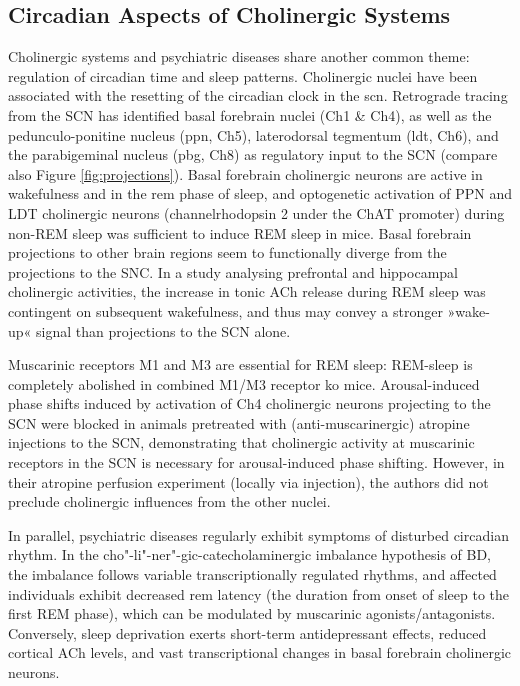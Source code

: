 \subsection{Circadian Aspects of Cholinergic Systems}
Cholinergic systems and psychiatric diseases share another common theme: regulation of circadian time and sleep patterns. Cholinergic nuclei have been associated with the resetting of the circadian clock in the \ac{scn}. Retrograde tracing from the SCN\cite{Bina1993} has identified basal forebrain nuclei (Ch1 \& Ch4), as well as the pedunculo-ponitine nucleus (\acs{ppn}, Ch5), laterodorsal tegmentum (\acs{ldt}, Ch6), and the parabigeminal nucleus (\ac{pbg}, Ch8) as regulatory input to the SCN (compare also Figure \ref{fig:projections}). Basal forebrain cholinergic neurons are active in wakefulness and in the \ac{rem} phase of sleep,\cite{Xu2015} and optogenetic activation of PPN and LDT cholinergic neurons (channelrhodopsin 2 under the ChAT promoter) during non-REM sleep was sufficient to induce REM sleep in mice.\cite{VanDort2015} Basal forebrain projections to other brain regions seem to functionally diverge from the projections to the SNC. In a study analysing prefrontal and hippocampal cholinergic activities, the increase in tonic ACh release during REM sleep was contingent on subsequent wakefulness,\cite{Teles-GriloRuivo2017} and thus may convey a stronger »wake-up« signal than projections to the SCN alone.

Muscarinic receptors M1 and M3 are essential for REM sleep: REM-sleep is completely abolished in combined M1/M3 receptor \ac{ko} mice.\cite{Niwa2018} Arousal-induced phase shifts induced by activation of Ch4 cholinergic neurons projecting to the SCN were blocked in animals pretreated with (anti-muscarinergic) atropine injections to the SCN, demonstrating that cholinergic activity at muscarinic receptors in the SCN is necessary for arousal-induced phase shifting.\cite{Yamakawa2016} However, in their atropine perfusion experiment (locally via injection), the authors did not preclude cholinergic influences from the other nuclei. 

In parallel, psychiatric diseases regularly exhibit symptoms of disturbed circadian rhythm. In the cho"-li"-ner"-gic-catecholaminergic imbalance hypothesis of BD,\cite{VanEnkhuizen2015} the imbalance follows variable transcriptionally regulated rhythms, and affected individuals exhibit decreased \ac{rem} latency (the duration from onset of sleep to the first REM phase), which can be modulated by muscarinic agonists/antagonists.\cite{Ising2005} Conversely, sleep deprivation exerts short-term antidepressant effects,\cite{Wu1990} reduced cortical ACh levels,\cite{Boonstra2007} and vast transcriptional changes in basal forebrain cholinergic neurons.\cite{Nikonova2017}

